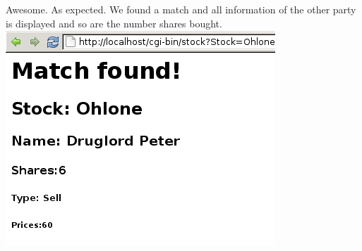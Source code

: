 Awesome. As expected. We found a match and all information of the other party is displayed and so are the number shares bought.  
\includegraphics[scale=0.5]{../test10.png}
 